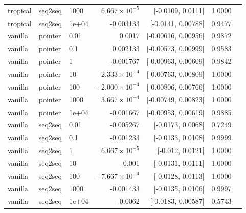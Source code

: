 \documentclass[10pt]{article}
\begin{document}
{\begin{longtable}{lllrrrl}
tropical & seq2seq & 1000 & $6.667\times10^{-5}$ & [-0.0109, 0.0111] & 1.0000 & \\
tropical & seq2seq & 1e+04 & -0.003133 & [-0.0141, 0.00788] & 0.9477 & \\
vanilla & pointer & 0.01 & 0.0017 & [-0.00616, 0.00956] & 0.9872 & \\
vanilla & pointer & 0.1 & 0.002133 & [-0.00573, 0.00999] & 0.9583 & \\
vanilla & pointer & 1 & -0.001767 & [-0.00963, 0.00609] & 0.9842 & \\
vanilla & pointer & 10 & $2.333\times10^{-4}$ & [-0.00763, 0.00809] & 1.0000 & \\
vanilla & pointer & 100 & $-2.000\times10^{-4}$ & [-0.00806, 0.00766] & 1.0000 & \\
vanilla & pointer & 1000 & $3.667\times10^{-4}$ & [-0.00749, 0.00823] & 1.0000 & \\
vanilla & pointer & 1e+04 & -0.001667 & [-0.00953, 0.00619] & 0.9885 & \\
vanilla & seq2seq & 0.01 & -0.005267 & [-0.0173, 0.0068] & 0.7249 & \\
vanilla & seq2seq & 0.1 & -0.001233 & [-0.0133, 0.0108] & 0.9999 & \\
vanilla & seq2seq & 1 & $6.667\times10^{-5}$ & [-0.012, 0.0121] & 1.0000 & \\
vanilla & seq2seq & 10 & -0.001 & [-0.0131, 0.0111] & 1.0000 & \\
vanilla & seq2seq & 100 & $-7.667\times10^{-4}$ & [-0.0128, 0.0113] & 1.0000 & \\
vanilla & seq2seq & 1000 & -0.001433 & [-0.0135, 0.0106] & 0.9997 & \\
vanilla & seq2seq & 1e+04 & -0.0062 & [-0.0183, 0.00587] & 0.5743 & \\
\bottomrule
\end{longtable}
}
\end{document}
